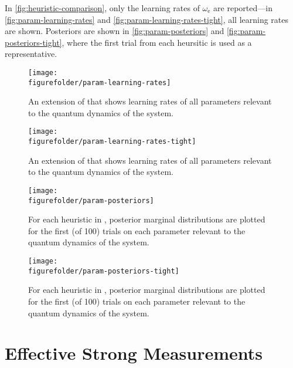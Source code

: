 \documentclass[aps,nofootinbib,twocolumn,superscriptaddress]{revtex4}
\newcommand{\figurefolder}{../fig}
\begin{document}
In \autoref{fig:heuristic-comparison}, only the learning rates of
$\omega_\text{e}$ are reported---in \autoref{fig:param-learning-rates} and
\autoref{fig:param-learning-rates-tight}, all learning rates are shown.
Posteriors are shown in \autoref{fig:param-posteriors} and
\autoref{fig:param-posteriors-tight}, where the first trial from each
heursitic is used as a representative.

\begin{figure*}
    \texttt{[image: \\figurefolder/param-learning-rates]}
    \caption{
        An extension of
        that shows learning rates of all parameters relevant to
        the quantum dynamics of the system.
        }
    \label{fig:param-learning-rates}
\end{figure*}

\begin{figure*}
    \texttt{[image: \\figurefolder/param-learning-rates-tight]}
    \caption{
        An extension of
        that shows learning rates of all parameters relevant to
        the quantum dynamics of the system.
        }
    \label{fig:param-learning-rates-tight}
\end{figure*}

\begin{figure*}
    \texttt{[image: \\figurefolder/param-posteriors]}
    \caption{
        For each heuristic in
        ,
        posterior marginal distributions are plotted for the first (of 100)
        trials on each parameter relevant to the quantum dynamics of the
        system.
        }
    \label{fig:param-posteriors}
\end{figure*}

\begin{figure*}
    \texttt{[image: \\figurefolder/param-posteriors-tight]}
    \caption{
        For each heuristic in
        ,
        posterior marginal distributions are plotted for the first (of 100)
        trials on each parameter relevant to the quantum dynamics of the
        system.
        }
    \label{fig:param-posteriors-tight}
\end{figure*}


\section{Effective Strong Measurements}
\label{apx:effective-strong-measurements}
\end{document}
